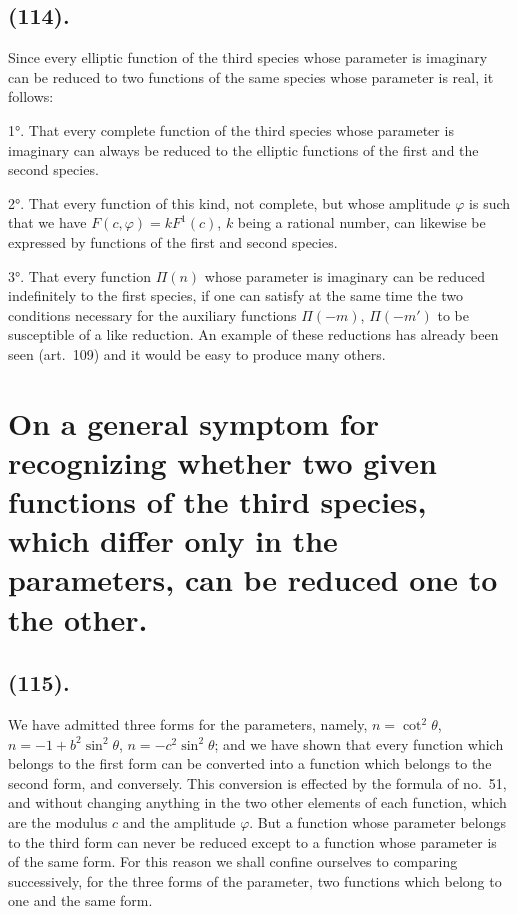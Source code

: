 \documentclass{article}
\begin{document}
\subsection*{(114).}

Since every elliptic function of the third species whose parameter is imaginary can be reduced to two functions of the same species whose parameter is real, it follows:

1°. That every complete function of the third species whose parameter is imaginary can always be reduced to the elliptic functions of the first and the second species.

2°. That every function of this kind, not complete, but whose amplitude $\varphi$ is such that we have $F(c,\varphi)=kF^{1}(c)$, $k$ being a rational number, can likewise be expressed by functions of the first and second species.


3°. That every function $\Pi(n)$ whose parameter is imaginary can be reduced indefinitely to the first species, if one can satisfy at the same time the two conditions necessary for the auxiliary functions $\Pi(-m)$, $\Pi(-m')$ to be susceptible of a like reduction. An example of these reductions has already been seen (art.\ 109) and it would be easy to produce many others.

\section*{On a general symptom for recognizing whether two given functions of the third species, which differ only in the parameters, can be reduced one to the other.}

\subsection*{(115).}

We have admitted three forms for the parameters, namely, $n=\cot^{2}\theta$, $n=-1+b^{2}\sin^{2}\theta$, $n=-c^{2}\sin^{2}\theta$; and we have shown that every function which belongs to the first form can be converted into a function which belongs to the second form, and conversely. This conversion is effected by the formula of no.\ 51, and without changing anything in the two other elements of each function, which are the modulus $c$ and the amplitude $\varphi$. But a function whose parameter belongs to the third form can never be reduced except to a function whose parameter is of the same form. For this reason we shall confine ourselves to comparing successively, for the three forms of the parameter, two functions which belong to one and the same form.
\end{document}
